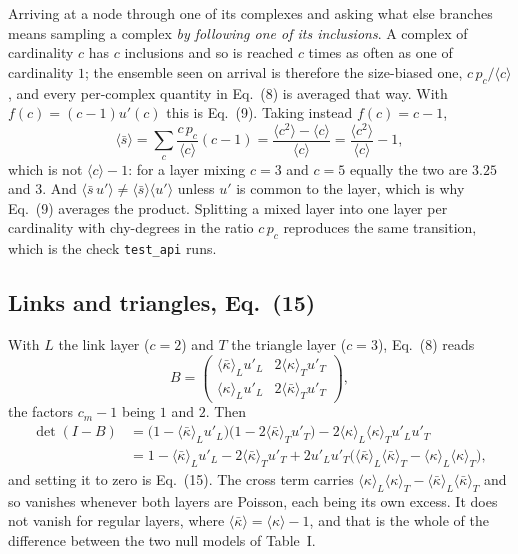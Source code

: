 \documentclass[aps,pre,onecolumn,superscriptaddress,floatfix,nofootinbib]{revtex4-2}
\newcommand{\ave}[1]{\langle #1 \rangle}
\newcommand{\code}[1]{\texttt{#1}}
\newcommand{\kbar}{\bar\kappa}
\newcommand{\sbar}{\bar s}
\begin{document}
Arriving at a node through one of its complexes and asking what else branches
means sampling a complex \emph{by following one of its inclusions}. A complex of
cardinality $c$ has $c$ inclusions and so is reached $c$ times as often as one
of cardinality $1$; the ensemble seen on arrival is therefore the size-biased
one, $c\,p_c/\ave{c}$, and every per-complex quantity in Eq.~(8) is averaged
that way. With $f(c)=(c-1)u'(c)$ this is Eq.~(9). Taking instead $f(c)=c-1$,
\begin{equation}
  \ave{\sbar}=\sum_c\frac{c\,p_c}{\ave{c}}(c-1)
  =\frac{\ave{c^{2}}-\ave{c}}{\ave{c}}
  =\frac{\ave{c^{2}}}{\ave{c}}-1 ,
  \label{eq:sbar}
\end{equation}
which is not $\ave{c}-1$: for a layer mixing $c=3$ and $c=5$ equally the two are
$3.25$ and $3$. And $\ave{\sbar\,u'}\neq\ave{\sbar}\ave{u'}$ unless $u'$ is
common to the layer, which is why Eq.~(9) averages the product. Splitting a
mixed layer into one layer per cardinality with chy-degrees in the ratio
$c\,p_c$ reproduces the same transition, which is the check
\code{test\_api} runs.

\subsection{Links and triangles, Eq.~(15)}

With $L$ the link layer ($c=2$) and $T$ the triangle layer ($c=3$), Eq.~(8) reads
\begin{equation}
  B=\begin{pmatrix}
      \ave{\kbar}_L u'_L & 2\ave{\kappa}_T u'_T\\[2pt]
      \ave{\kappa}_L u'_L & 2\ave{\kbar}_T u'_T
    \end{pmatrix},
\end{equation}
the factors $c_m-1$ being $1$ and $2$. Then
\begin{equation}
  \begin{split}
  \det(I-B)&=\big(1-\ave{\kbar}_Lu'_L\big)\big(1-2\ave{\kbar}_Tu'_T\big)
             -2\ave{\kappa}_L\ave{\kappa}_Tu'_Lu'_T\\
  &=1-\ave{\kbar}_Lu'_L-2\ave{\kbar}_Tu'_T
     +2u'_Lu'_T\big(\ave{\kbar}_L\ave{\kbar}_T-\ave{\kappa}_L\ave{\kappa}_T\big),
  \end{split}
\end{equation}
and setting it to zero is Eq.~(15). The cross term carries
$\ave{\kappa}_L\ave{\kappa}_T-\ave{\kbar}_L\ave{\kbar}_T$ and so vanishes
whenever both layers are Poisson, each being its own excess. It does not vanish
for regular layers, where $\ave{\kbar}=\ave{\kappa}-1$, and that is the whole of
the difference between the two null models of Table~I.
\end{document}
